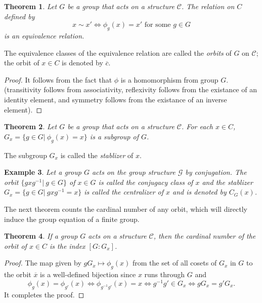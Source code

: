 \documentclass{assignment}[2019/10/15]
\theoremstyle{plain}
\newtheorem{theorem}{Theorem}[section]
\newtheorem{example}[theorem]{Example}
\numberwithin{equation}{section}
\begin{document}
    \begin{theorem}
        Let $G$ be a group that acts on a structure $\mathcal{C}$. The relation on $C$ defined by
        \begin{equation}
            x\sim x' \Longleftrightarrow \phi_g(x) = x'\text{ for some }g\in G
        \end{equation}
        is an equivalence relation.
    \end{theorem}

    The equivalence classes of the equivalence relation are called the \emph{orbits} of $G$ on $\mathcal{C}$; the orbit of $x\in C$ is denoted by $\overline{c}$.

    \begin{proof}
        It follows from the fact that $\phi$ is a homomorphism from group $G$. (transitivity follows from associativity, reflexivity follows from the existance of an identity element, and symmetry follows from the existance of an inverse element).
    \end{proof}

    \begin{theorem}
        Let $G$ be a group that acts on a structure $\mathcal{C}$. For each $x\in C$, $G_x=\{g\in G|\ \phi_g(x) = x\}$ is a subgroup of $G$.
    \end{theorem}

    The subgroup $G_x$ is called the \emph{stablizer} of $x$.

    \begin{example}
        Let a group $G$ acts on the group structure $\mathcal{G}$ by conjugation. The orbit $\{gxg^{-1}|\ g\in G\}$ of $x\in G$ is called the \emph{conjugacy class} of $x$ and the stablizer $G_x=\{g\in G|\ gxg^{-1} = x\}$ is called the \emph{centralizer} of $x$ and is denoted by $C_G(x)$.
    \end{example}

    The next theorem counts the cardinal number of any orbit, which will directly induce the group equation of a finite group.

    \begin{theorem}
        If a group $G$ acts on a structure $\mathcal{C}$, then the cardinal number of the orbit of $x\in C$ is the index $[G:G_x]$.
    \end{theorem}

    \begin{proof}
        The map given by $gG_x\mapsto \phi_g(x)$ from the set of all cosets of $G_x$ in $G$ to the orbit $\overline{x}$ is a well-defined bijection since $x$ runs through $G$ and
        \begin{equation}
            \phi_g(x)=\phi_{g'}(x)\Longleftrightarrow \phi_{g^{-1}g'}(x)=x\Longleftrightarrow g^{-1}g'\in G_x\Longleftrightarrow gG_x = g'G_x.
        \end{equation}
        It completes the proof.
    \end{proof}
\end{document}
